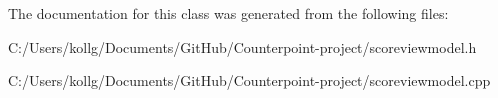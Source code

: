 The documentation for this class was generated from the following files\+:\begin{DoxyCompactItemize}
\item 
C\+:/\+Users/kollg/\+Documents/\+Git\+Hub/\+Counterpoint-\/project/scoreviewmodel.\+h\item 
C\+:/\+Users/kollg/\+Documents/\+Git\+Hub/\+Counterpoint-\/project/scoreviewmodel.\+cpp\end{DoxyCompactItemize}
